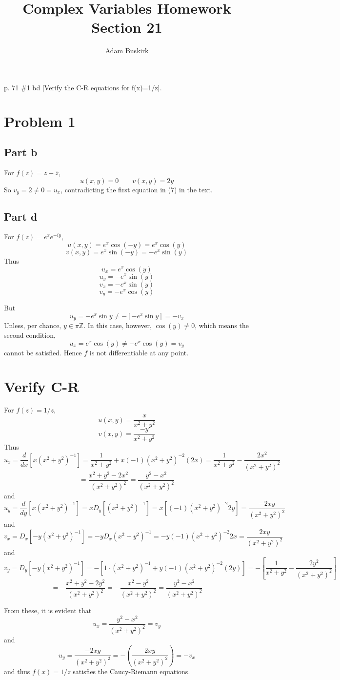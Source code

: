 \documentclass{article}
\title{Complex Variables Homework Section 21}
\author{Adam Buskirk}
\theoremstyle{definition}
\newcommand{\Z}{\mathbb{Z}}
\newcommand{\p}[1]{\left(#1\right)}
\newcommand{\sq}[1]{\left[#1\right]}
\begin{document}
\maketitle
p. 71 \#1 bd [Verify the C-R equations for f(x)=1/z].

\section{Problem 1}
\subsection{Part b}
For $f(z) = z-\bar{z}$, 
\[ u(x,y) = 0 \qquad v(x,y) = 2y \]
So $v_y = 2 \neq 0 = u_x$, contradicting the first equation in (7) in the text.

\subsection{Part d}
For $f(z)=e^x e^{-iy}$,
\[ u(x,y) = e^x \cos(-y) = e^x \cos(y) \]
\[ v(x,y) = e^x \sin(-y) = -e^x \sin(y) \]
Thus
\[ u_x = e^x \cos(y) \]
\[ u_y = -e^x \sin(y) \]
\[ v_x = -e^x \sin(y) \]
\[ v_y = -e^x \cos(y) \]

But
\[ u_y = -e^x \sin y \neq -\sq{ -e^x \sin y} = -v_x \]
Unless, per chance, $y \in \pi\Z$. In this case, however, $\cos(y) \neq 0$,
which means the second condition,
\[ u_x = e^x \cos(y) \neq -e^x \cos(y) = v_y \]
cannot be satisfied. Hence $f$ is not differentiable at any point.

\section{Verify C-R}
For $f(z)=1/z$,
\[ u(x,y) = \frac{x}{x^2+y^2} \]
\[ v(x,y) = \frac{-y}{x^2+y^2} \]
Thus 
\[ 
u_x 
= \frac{d}{dx} \sq{ x(x^2+y^2)^{-1} }
= \frac{1}{x^2+y^2} + x (-1) (x^2+y^2)^{-2} (2x) 
= \frac{1}{x^2+y^2} - \frac{ 2x^2 }{(x^2+y^2)^2}
\]
\[
= \frac{x^2+y^2 - 2x^2}{(x^2+y^2)^2}
= \frac{y^2-x^2}{(x^2+y^2)^2}
\]
and
\[
u_y
= \frac{d}{dy} \sq{x (x^2+y^2)^{-1} }
= x D_y \sq{ (x^2+y^2)^{-1} }
= x \sq{(-1) (x^2+y^2)^{-2} 2y}
= \frac{-2xy}{(x^2+y^2)^{2}}
\]
and
\[
v_x 
= D_x \sq{-y (x^2+y^2)^{-1}}
= -y D_x (x^2+y^2)^{-1}
= -y (-1) (x^2+y^2)^{-2} 2x
= \frac{2xy}{(x^2+y^2)^{2}}
\]
and 
\[
v_y
= D_y \sq{ -y (x^2+y^2)^{-1} }
= - \sq{1 \cdot (x^2+y^2)^{-1} + y (-1) (x^2+y^2)^{-2} (2y) }
= - \sq{\frac{1}{x^2+y^2} - \frac{2y^2}{(x^2+y^2)^2}  }
\]
\[
= - \frac{x^2+y^2 - 2y^2}{(x^2+y^2)^2}
= - \frac{x^2-y^2}{(x^2+y^2)^2}
= \frac{y^2-x^2}{(x^2+y^2)^2}
\]

From these, it is evident that
\[
u_x = \frac{y^2-x^2}{(x^2+y^2)^2} = v_y 
\]
and
\[ 
u_y = \frac{-2xy}{(x^2+y^2)^2} = -\p{\frac{2xy}{(x^2+y^2)^2}} = -v_x
\]
and thus $f(x) = 1/z$ satisfies the Caucy-Riemann equations.
\end{document}
